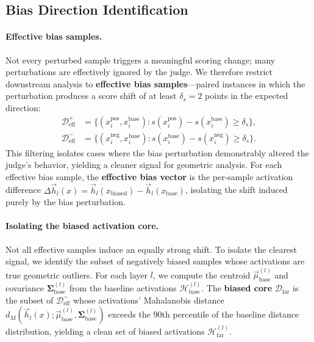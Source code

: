 \documentclass[11pt]{article}
\begin{document}
\subsection{Bias Direction Identification}
\label{subsec:bias_direction}

\paragraph{Effective bias samples.}
Not every perturbed sample triggers a meaningful scoring change; many perturbations are effectively ignored by the judge. We therefore restrict downstream analysis to \textbf{effective bias samples}---paired instances in which the perturbation produces a score shift of at least $\delta_s = 2$ points in the expected direction:
\begin{equation}
\begin{aligned}
\mathcal{D}_{\text{eff}}^{+} &= \{(x_i^{\text{pos}}, x_i^{\text{base}}) : s(x_i^{\text{pos}}) - s(x_i^{\text{base}}) \geq \delta_s \}, \\
\mathcal{D}_{\text{eff}}^{-} &= \{(x_i^{\text{neg}}, x_i^{\text{base}}) : s(x_i^{\text{base}}) - s(x_i^{\text{neg}}) \geq \delta_s \}.
\end{aligned}
\end{equation}
This filtering isolates cases where the bias perturbation demonstrably altered the judge's behavior, yielding a cleaner signal for geometric analysis. For each effective bias sample, the \textbf{effective bias vector} is the per-sample activation difference $\Delta \vec{h}_l(x) = \vec{h}_l(x_{\text{biased}}) - \vec{h}_l(x_{\text{base}})$, isolating the shift induced purely by the bias perturbation.

\paragraph{Isolating the biased activation core.}
Not all effective samples induce an equally strong shift. To isolate the clearest signal, we identify the subset of negatively biased samples whose activations are true geometric outliers. For each layer $l$, we compute the centroid $\vec{\mu}_{\text{base}}^{(l)}$ and covariance $\mathbf{\Sigma}_{\text{base}}^{(l)}$ from the baseline activations $\mathcal{H}_{\text{base}}^{(l)}$. The \textbf{biased core} $\mathcal{D}_{\text{far}}$ is the subset of $\mathcal{D}_{\text{eff}}^{-}$ whose activations' Mahalanobis distance $d_M(\vec{h}_l(x); \vec{\mu}_{\text{base}}^{(l)}, \mathbf{\Sigma}_{\text{base}}^{(l)})$ exceeds the 90th percentile of the baseline distance distribution, yielding a clean set of biased activations $\mathcal{H}_{\text{far}}^{(l)}$.
\end{document}
